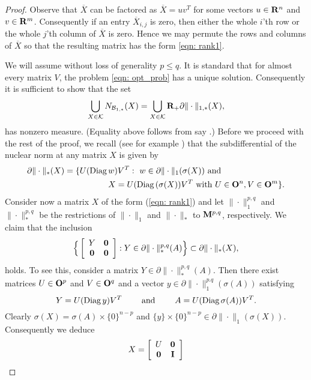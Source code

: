 \documentclass[smallextended,numbook]{svjour3}
\begin{document}
\begin{proof}
Observe that $\overline{X}$ can be factored as $\overline{X}=uv^{T}$ for some vectors $u\in{{\bf R}}^n$ and $v\in{{\bf R}}^m$. Consequently if an entry $\overline{X}_{i,j}$ is zero, then either the whole $i$'th row or the whole $j$'th column of $\overline{X}$ is zero. Hence we may permute the rows and columns of $\overline{X}$ so that the resulting matrix has the form \eqref{eqn: rank1}.

We will assume without loss of generality $p \leq q$. It is standard that for almost every matrix $V$, the problem \eqref{eqn: opt_prob} has a unique solution. Consequently it is sufficient to show that the set
$$\bigcup_{X\in \mathcal{K}} N_{{{\cal B}}_{1,*}}(X)= \bigcup_{X\in \mathcal{K}} {{\bf R}}_+\partial \|\cdot\|_{1,*}(X),$$
has nonzero measure. (Equality above follows from say \cite[Corollary~23.7.21]{con_ter}.)
Before we proceed with the rest of the proof, we recall (see for example \cite[Theorem~7.1]{LHSing}) that the subdifferential of the nuclear norm at any matrix $X$ is given by 
\begin{align*}
\partial \|\cdot\|_{*}(X)=\{U({\mbox{\rm Diag}\,} &w) V^T:~ w\in\partial \|\cdot\|_{1}(\sigma(X)) \textrm{ and }\\
 &X=U({\mbox{\rm Diag}\,} (\sigma(X))V^T \textrm{ with } U\in {\bf O}^n,  V\in {\bf O}^m \}.
\end{align*}
Consider now a matrix $X$ of the form (\ref{eqn: rank1}) and let $\|\cdot\|^{p,q}_{1}$ and $\|\cdot\|^{p,q}_{*}$ be the restrictions of $\|\cdot\|_1$ and $\|\cdot\|_{*}$ to ${\bf M}^{p,q}$, respectively. We claim that the inclusion 
$$\Big\{\left[ \begin{array}{ccc}
Y & {\bf 0}  \\
{\bf 0} & {\bf 0} \end{array} \right]
: Y\in \partial \|\cdot\|^{p,q}_{*}(A)\Big\}\subset \partial \|\cdot\|_{*}(X),$$
holds. To see this, consider  a matrix $Y\in \partial \|\cdot\|^{p,q}_{*}(A)$. Then there exist matrices $U\in {\bf O}^p$ and $V\in {\bf O}^q$ and a vector $y\in\partial \|\cdot\|^{p.q}_1(\sigma(A))$ satisfying  
$$Y=U({\mbox{\rm Diag}\,} y) V^T \qquad \textrm{ and } \qquad A=U({\mbox{\rm Diag}\,}\sigma(A)) V^T.$$
Clearly $\sigma(X)=\sigma(A)\times\{0\}^{n-p}$ and $\{y\}\times\{0\}^{n-p}\in\partial \|\cdot\|_1(\sigma(X))$.
Consequently we deduce 
$$X=\left[ \begin{array}{ccc}
U & {\bf 0}  \\
{\bf 0} & {\bf I} \end{array} \right] 
$$
\end{proof}
\end{document}
